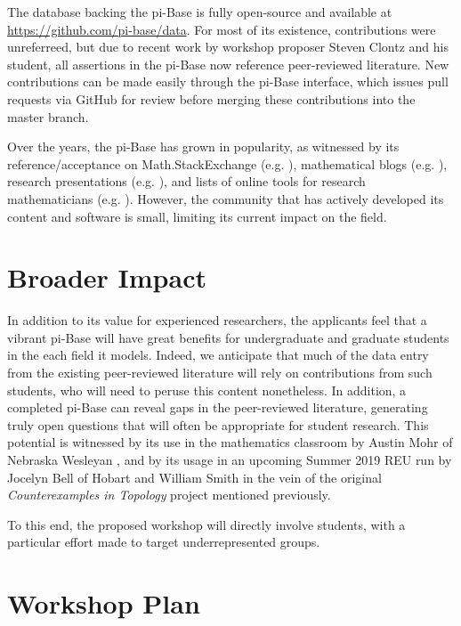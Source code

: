 \documentclass{amsart}
\begin{document}
The database backing the pi-Base is fully open-source and available
at \url{https://github.com/pi-base/data}.
For most of its existence, contributions were
unreferreed, but due to recent work by workshop proposer Steven Clontz
and his student,
all assertions in the pi-Base now reference peer-reviewed literature.
New contributions can be made easily through the pi-Base interface,
which issues pull requests via GitHub for review before merging 
these contributions into the master branch.

Over the years, the pi-Base has grown in popularity,
as witnessed by its reference/acceptance on Math.StackExchange 
(e.g. \cite{157918}), mathematical blogs (e.g. \cite{lamb_2018}),
research presentations (e.g. \cite{clontzPiBase}),
and lists of online tools for research mathematicians 
(e.g. \cite{scheepersPiBase}). However, the community that has
actively developed its content and software is small, limiting its
current impact on the field.

\section{Broader Impact}

In addition to its value for experienced researchers, the applicants
feel that a vibrant pi-Base will have great benefits for 
undergraduate and graduate students in the each field it models.
Indeed, we anticipate that much of the
data entry from the existing peer-reviewed literature
will rely on contributions from such students, who will need to
peruse this content nonetheless. In addition, a completed pi-Base
can reveal gaps in the peer-reviewed literature, generating truly
open questions that will often be appropriate for student research.
This potential is witnessed by its use in the mathematics classroom
by Austin Mohr of Nebraska Wesleyan \cite{mohrPiBase}, 
and by its usage in an upcoming Summer 2019 REU run by Jocelyn Bell of
Hobart and William Smith in the vein of the original
\textit{Counterexamples in Topology} project mentioned previously.

To this end, the proposed workshop will directly involve students,
with a particular effort made to target underrepresented groups.

\section{Workshop Plan}
\end{document}
